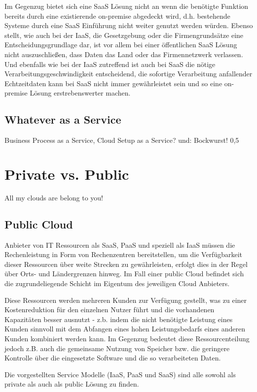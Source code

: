 \documentclass[journal]{IEEEtran}
\begin{document}
Im Gegenzug bietet sich eine SaaS Lösung nicht an wenn die benötigte Funktion bereits durch eine existierende on-premise abgedeckt wird, d.h. bestehende Systeme durch eine SaaS Einführung nicht weiter genutzt werden würden. Ebenso stellt, wie auch bei der IaaS, die Gesetzgebung oder die Firmengrundsätze eine Entscheidungsgrundlage dar, ist vor allem bei einer öffentlichen SaaS Lösung nicht auszuschließen, dass Daten das Land oder das Firmennetzwerk verlassen. Und ebenfalls wie bei der IaaS zutreffend ist auch bei SaaS die nötige Verarbeitungsgeschwindigkeit entscheidend, die sofortige Verarbeitung anfallender Echtzeitdaten kann bei SaaS nicht immer gewährleistet sein und so eine on-premise Lösung erstrebenswerter machen.

\subsection{Whatever as a Service}
Business Process as a Service, Cloud Setup as a Service? und: Bockwurst!
0,5


\section{Private vs. Public}
All my clouds are belong to you!

\subsection{Public Cloud}
Anbieter von IT Ressourcen als SaaS, PaaS und speziell als IaaS müssen die Rechenleistung in Form von Rechenzentren bereitstellen, um die Verfügbarkeit dieser Ressourcen über weite Strecken zu gewährleisten, erfolgt dies in der Regel über Orts- und Ländergrenzen hinweg. Im Fall einer public Cloud befindet sich die zugrundeliegende Schicht im Eigentum des jeweiligen Cloud Anbieters.

Diese Ressourcen werden mehreren Kunden zur Verfügung gestellt, was zu einer Kostenreduktion für den einzelnen Nutzer führt und die vorhandenen Kapazitäten besser ausnutzt - z.b. indem die nicht benötigte Leistung eines Kunden sinnvoll mit dem Abfangen eines hohen Leistungsbedarfs eines anderen Kunden kombiniert werden kann.
Im Gegenzug bedeutet diese Ressourcenteilung jedoch z.B. auch die gemeinsame Nutzung von Speicher bzw. die geringere Kontrolle über die eingesetzte Software und die so verarbeiteten Daten.

Die vorgestellten Service Modelle (IaaS, PaaS und SaaS) sind alle sowohl als private als auch als public Lösung zu finden.
\end{document}
